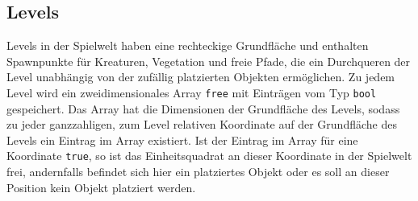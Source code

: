 \subsection{Levels}
Levels in der Spielwelt haben eine rechteckige Grundfläche und enthalten Spawnpunkte für Kreaturen, Vegetation und freie Pfade, die ein Durchqueren der Level unabhängig von der zufällig platzierten Objekten ermöglichen.
Zu jedem Level wird ein zweidimensionales Array \texttt{free} mit Einträgen vom Typ \texttt{bool} gespeichert. Das Array hat die Dimensionen der Grundfläche des Levels, sodass zu jeder ganzzahligen, zum Level relativen Koordinate auf der Grundfläche des Levels ein Eintrag im Array existiert. Ist der Eintrag im Array für eine Koordinate \texttt{true}, so ist das Einheitsquadrat an dieser Koordinate in der Spielwelt frei, andernfalls befindet sich hier ein platziertes Objekt oder es soll an dieser Position kein Objekt platziert werden.
 
